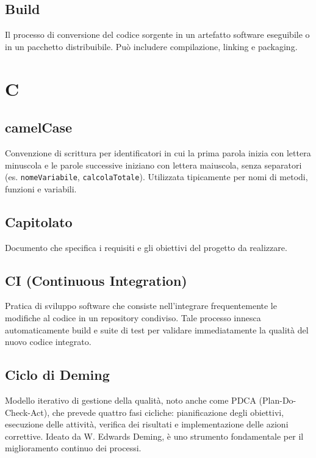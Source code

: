 \documentclass[a4paper, 11pt, oneside]{scrartcl} %
\begin{document}
\subsection*{Build}
Il processo di conversione del codice sorgente in un artefatto software eseguibile o in un pacchetto distribuibile. Può includere compilazione, linking e packaging.
\vspace{0.5cm}


\section*{C}


\subsection*{camelCase}
Convenzione di scrittura per identificatori in cui la prima parola inizia con lettera minuscola e le parole successive iniziano con lettera maiuscola, senza separatori (es. \texttt{nomeVariabile}, \texttt{calcolaTotale}). Utilizzata tipicamente per nomi di metodi, funzioni e variabili.
\vspace{0.5cm}

\subsection*{Capitolato}
Documento che specifica i requisiti e gli obiettivi del progetto da realizzare.
\vspace{0.5cm}

\subsection*{CI (Continuous Integration)}
Pratica di sviluppo software che consiste nell'integrare frequentemente le modifiche al codice in un repository condiviso. Tale processo innesca automaticamente build e suite di test per validare immediatamente la qualità del nuovo codice integrato.
\vspace{0.5cm}

\subsection*{Ciclo di Deming}
Modello iterativo di gestione della qualità, noto anche come PDCA (Plan-Do-Check-Act), che prevede quattro fasi cicliche: pianificazione degli obiettivi, esecuzione delle attività, verifica dei risultati e implementazione delle azioni correttive. Ideato da W. Edwards Deming, è uno strumento fondamentale per il miglioramento continuo dei processi.
\vspace{0.5cm}
\end{document}
